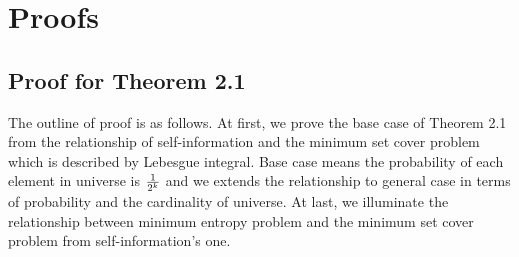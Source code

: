 \section{Proofs}
\subsection{Proof for Theorem 2.1}
The outline of proof is as follows. 
At first, we prove the base case of Theorem 2.1 from the relationship of self-information and the minimum set cover problem which is described by Lebesgue integral.
Base case means the probability of each element in universe is ${1 \over 2^k}$ and we extends the relationship 
to general case in terms of probability and the cardinality of universe.
At last, we illuminate the relationship between minimum entropy problem and the minimum set cover problem from self-information’s one.


